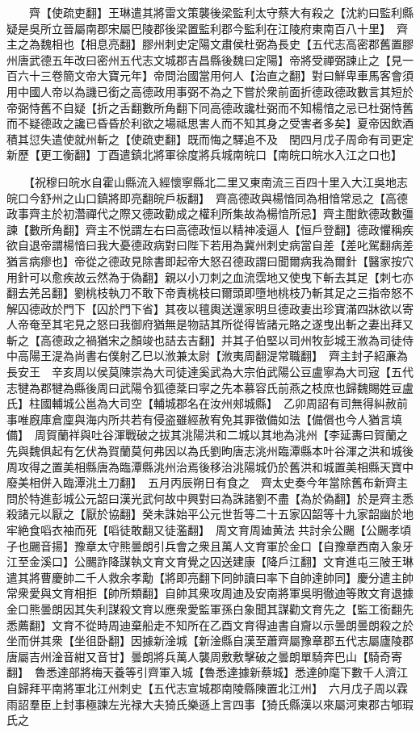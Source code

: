 　　齊【使疏吏翻】王琳遣其將雷文策襲後梁監利太守蔡大有殺之【沈約曰監利縣疑是吳所立晉屬南郡宋屬巴陵郡後梁置監利郡今監利在江陵府東南百八十里】　齊主之為魏相也【相息亮翻】膠州刺史定陽文肅侯杜弼為長史【五代志高密郡舊置膠州唐武德五年改曰密州五代志文城郡吉昌縣後魏曰定陽】帝將受禪弼諫止之【見一百六十三卷簡文帝大寶元年】帝問治國當用何人【治直之翻】對曰鮮卑車馬客會須用中國人帝以為譏已銜之高德政用事弼不為之下嘗於衆前面折德政德政數言其短於帝弼恃舊不自疑【折之舌翻數所角翻下同高德政讒杜弼而不知楊愔之忌已杜弼恃舊而不疑德政之讒已昏昏於利欲之場祗思害人而不知其身之受害者多矣】夏帝因飲酒積其愆失遣使就州斬之【使疏吏翻】既而悔之驛追不及　閏四月戊子周命有司更定新歷【更工衡翻】丁酉遣鎮北將軍徐度將兵城南皖口【南皖口皖水入江之口也】

　　【祝穆曰皖水自霍山縣流入經懷寧縣北二里又東南流三百四十里入大江吳地志皖口今舒州之山口鎮將即亮翻皖戶板翻】　齊高德政與楊愔同為相愔常忌之【高德政事齊主於初濳禪代之際又德政勸成之權利所集故為楊愔所忌】齊主酣飲德政數彊諫【數所角翻】齊主不悦謂左右曰高德政恒以精神凌逼人【恒戶登翻】德政懼稱疾欲自退帝謂楊愔曰我大憂德政病對曰陛下若用為冀州刺史病當自差【差叱駕翻病差猶言病瘳也】帝從之德政見除書即起帝大怒召德政謂曰聞爾病我為爾針【醫家按穴用針可以愈疾故云然為于偽翻】親以小刀刺之血流霑地又使曳下斬去其足【刺七亦翻去羌呂翻】劉桃枝執刀不敢下帝責桃枝曰爾頭即墮地桃枝乃斬其足之三指帝怒不解囚德政於門下【囚於門下省】其夜以氊輿送還家明旦德政妻出珍寶滿四牀欲以寄人帝奄至其宅見之怒曰我御府猶無是物詰其所從得皆諸元賂之遂曳出斬之妻出拜又斬之【高德政之禍猶宋之顏竣也詰去吉翻】并其子伯堅以司州牧彭城王浟為司徒侍中高陽王湜為尚書右僕射乙巳以浟兼太尉【浟夷周翻湜常職翻】　齊主封子紹亷為長安王　辛亥周以侯莫陳崇為大司徒達奚武為大宗伯武陽公豆盧寧為大司宼【五代志犍為郡犍為縣後周曰武陽令狐德棻曰寜之先本慕容氏前燕之枝庶也歸魏賜姓豆盧氏】柱國輔城公邕為大司空【輔城郡名在汝州郟城縣】　乙卯周詔有司無得糾赦前事唯廐庫倉廩與海内所共若有侵盗雖經赦宥免其罪徵備如法【備償也今人猶言填備】　周賀蘭祥與吐谷渾戰破之拔其洮陽洪和二城以其地為洮州【李延夀曰賀蘭之先與魏俱起有乞伏為賀蘭莫何弗因以為氏劉昫唐志洮州臨潭縣本叶谷渾之洪和城後周攻得之置美相縣唐為臨潭縣洮州治焉後移治洮陽城仍於舊洪和城置美相縣天寶中廢美相併入臨潭洮土刀翻】　五月丙辰朔日有食之　齊太史奏今年當除舊布新齊主問於特進彭城公元韶曰漢光武何故中興對曰為誅諸劉不盡【為於偽翻】於是齊主悉殺諸元以厭之【厭於協翻】癸未誅始平公元世哲等二十五家囚韶等十九家韶幽於地牢絶食㗖衣袖而死【㗖徒敢翻又徒濫翻】　周文育周廸黄法共討余公颺【公颺孝頃子也颺音揚】豫章太守熊曇朗引兵會之衆且萬人文育軍於金口【自豫章西南入象牙江至金溪口】公颺詐降謀執文育文育覺之囚送建康【降戶江翻】文育進屯三陂王琳遣其將曹慶帥二千人救余孝勱【將即亮翻下同帥讀曰率下自帥達帥同】慶分遣主帥常衆愛與文育相拒【帥所類翻】自帥其衆攻周迪及安南將軍吳明徹迪等敗文育退據金口熊曇朗因其失利謀殺文育以應衆愛監軍孫白象聞其謀勸文育先之【監工銜翻先悉薦翻】文育不從時周迪棄船走不知所在乙酉文育得迪書自齎以示曇朗曇朗殺之於坐而併其衆【坐徂卧翻】因據新淦城【新淦縣自漢至蕭齊屬豫章郡五代志屬廬陵郡唐屬吉州淦音紺又音甘】曇朗將兵萬人襲周敷敷擊破之曇朗單騎奔巴山【騎奇寄翻】　魯悉達部將梅天養等引齊軍入城【魯悉達據新蔡城】悉達帥麾下數千人濟江自歸拜平南將軍北江州刺史【五代志宣城郡南陵縣陳置北江州】　六月戊子周以霖雨詔羣臣上封事極諫左光禄大夫猗氏樂遜上言四事【猗氏縣漢以來屬河東郡古郇瑕氏之